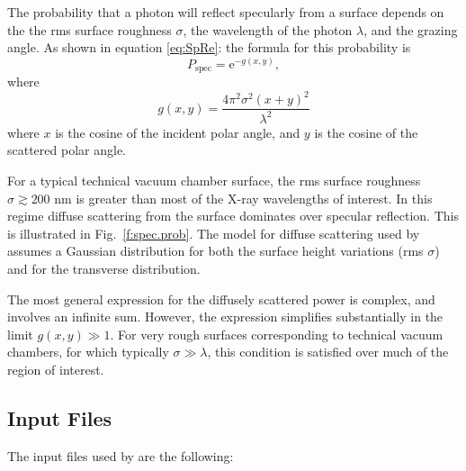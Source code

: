 The probability that a photon will reflect specularly from a surface depends on the the rms surface roughness $\sigma$, the wavelength of the photon $\lambda$, and the grazing angle. As shown in equation \ref{eq:SpRe}:
the formula for this probability is~\cite{b:beckmann}
   \begin{equation}
   \label{eq:SpRe}
P_{\textrm{spec}}=\textrm{e}^{-g(x,y)},
\end{equation}
where
   \begin{equation}
g(x,y)=\frac{4\pi^{2}\sigma^{2}(x+y)^{2}}{\lambda^{2}}
  \end{equation}
where $x$ is the cosine of the incident polar angle, and $y$ is the
cosine of the scattered polar angle.

For a typical technical vacuum chamber surface, the rms surface roughness $\sigma \gtrsim 200$ nm is
greater than most of the X-ray wavelengths of interest. In this regime diffuse scattering from the surface dominates over specular reflection. This is illustrated in Fig.~\ref{f:spec.prob}.
The model for diffuse scattering used by \srthree assumes a Gaussian distribution for both the surface height variations (rms $\sigma$) and for the transverse distribution.

The most general expression for the diffusely scattered power is complex, and involves an infinite sum.  However, the expression simplifies substantially in the limit $g(x,y)\gg 1.$ For very rough surfaces corresponding to technical vacuum chambers, for which typically $\sigma \gg \lambda$, this condition is satisfied over much of the region of interest.

\subsection{Input Files}
The input files used by \srthree are the following:

